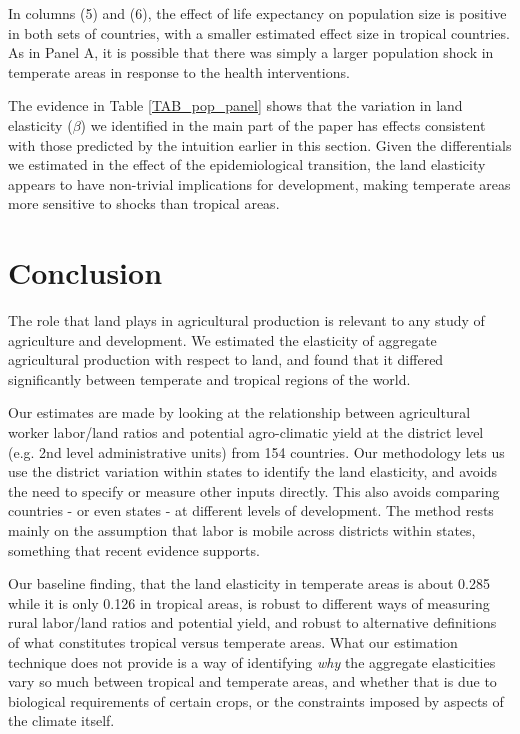 \documentclass[12pt]{article}
\begin{document}
In columns (5) and (6), the effect of life expectancy on population size is positive in both sets of countries, with a smaller estimated effect size in tropical countries. As in Panel A, it is possible that there was simply a larger population shock in temperate areas in response to the health interventions. 

The evidence in Table \ref{TAB_pop_panel} shows that the variation in land elasticity ($\beta$) we identified in the main part of the paper has effects consistent with those predicted by the intuition earlier in this section. Given the differentials we estimated in the effect of the epidemiological transition, the land elasticity appears to have non-trivial implications for development, making temperate areas more sensitive to shocks than tropical areas.

\section{Conclusion}
The role that land plays in agricultural production is relevant to any study of agriculture and development. We estimated the elasticity of aggregate agricultural production with respect to land, and found that it differed significantly between temperate and tropical regions of the world.

Our estimates are made by looking at the relationship between agricultural worker labor/land ratios and potential agro-climatic yield at the district level (e.g. 2nd level administrative units) from 154 countries. Our methodology lets us use the district variation within states to identify the land elasticity, and avoids the need to specify or measure other inputs directly. This also avoids comparing countries - or even states - at different levels of development. The method rests mainly on the assumption that labor is mobile across districts within states, something that recent evidence supports. 

Our baseline finding, that the land elasticity in temperate areas is about 0.285 while it is only 0.126 in tropical areas, is robust to different ways of measuring rural labor/land ratios and potential yield, and robust to alternative definitions of what constitutes tropical versus temperate areas. What our estimation technique does not provide is a way of identifying \textit{why} the aggregate elasticities vary so much between tropical and temperate areas, and whether that is due to biological requirements of certain crops, or the constraints imposed by aspects of the climate itself.
\end{document}
